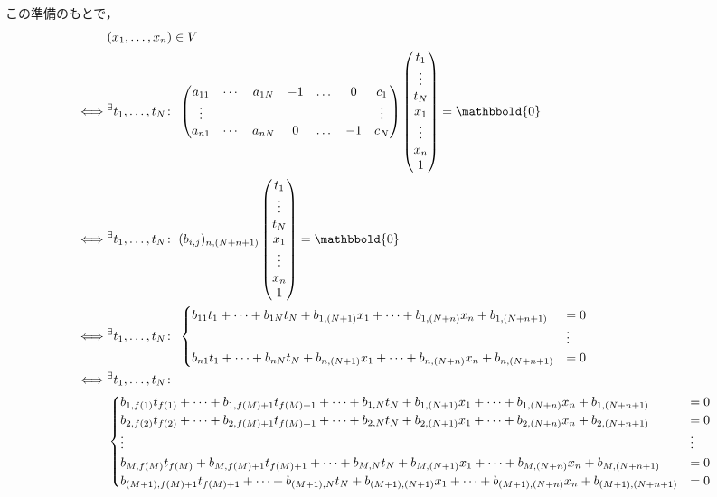 \documentclass[9pt]{ltjsarticle}
\newcommand{\bbold}{\mathbbold}
\begin{document}
\begin{itemize}
この準備のもとで，
\begin{align}
& (x_1,\dots, x_n) \in V\\
\iff &
\Exists{t_1,\dots,t_N}
\begin{pmatrix}
 a_{11} & \cdots & a_{1N} & -1 & \dots & 0 & c_1\\
 \vdots& & & & & & \vdots\\
 a_{n1} & \cdots & a_{nN} & 0 & \dots & -1 & c_N
\end{pmatrix}
\tatev{t_1 \\ \vdots \\ t_N \\ x_1 \\ \vdots \\ x_n \\ 1}
 =
\bbold{0}\\
\iff &
\Exists{t_1,\dots,t_N} (b_{i,j})_{n,(N+n+1)}
 \tatev{t_1 \\ \vdots \\ t_N \\ x_1 \\ \vdots \\ x_n \\ 1}
 =
\bbold{0}\\
\iff &
\Exists{t_1,\dots,t_N}
\begin{cases}
 b_{11}t_1 + \dots + b_{1N}t_N + b_{1,(N+1)} x_1 + \dots + b_{1,(N+n)} x_n + b_{1,(N+n+1)} &= 0 \\
&\vdots\\
 b_{n1}t_1 + \dots + b_{nN}t_N + b_{n,(N+1)} x_1 + \dots + b_{n,(N+n)} x_n + b_{n,(N+n+1)} &= 0
\end{cases}\\
\iff &
\Exists{t_1,\dots,t_N} \\
&\begin{cases}
 b_{1,f(1)} t_{f(1)} + \dots + b_{1,f(M)+1}t_{f(M)+1} + \dots + b_{1,N}t_N + b_{1,(N+1)} x_1 + \dots + b_{1,(N+n)} x_n + b_{1,(N+n+1)} &= 0 \\
 b_{2,f(2)} t_{f(2)} + \dots + b_{2,f(M)+1}t_{f(M)+1} + \dots + b_{2,N}t_N + b_{2,(N+1)} x_1 + \dots + b_{2,(N+n)} x_n + b_{2,(N+n+1)} &= 0 \\
\vdots&\vdots \\
 b_{M,f(M)} t_{f(M)} +  b_{M,f(M)+1}t_{f(M)+1} + \dots + b_{M,N}t_N + b_{M,(N+1)} x_1 + \dots + b_{M,(N+n)} x_n + b_{M,(N+n+1)} &= 0 \\
b_{(M+1),f(M)+1}t_{f(M)+1} + \dots + b_{(M+1),N}t_N + b_{(M+1),(N+1)}x_1 + \dots + b_{(M+1),(N+n)}x_n + b_{(M+1),(N+n+1)} &= 0\\

\end{cases}
\end{align}
\end{itemize}
\end{document}
